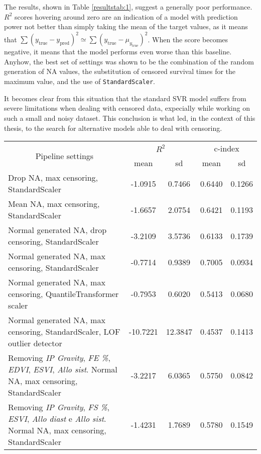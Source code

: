\documentclass[12pt]{report}
\begin{document}
The results, shown in Table \ref{resultstab:1}, suggest a generally poor performance. $R^2$ scores hovering around zero are an indication of a model with prediction power not better than simply taking the mean of the target values, as it means that $\sum(y_{\text{true}} - y_{\text{pred}})^2 \simeq \sum(y_{\text{true}} - \mu_{y_{\text{true}}})^2$. When the score becomes negative, it means that the model performs even worse than this baseline. Anyhow, the best set of settings was shown to be the combination of the random generation of NA values, the substitution of censored survival times for the maximum value, and the use of \texttt{StandardScaler}.

It becomes clear from this situation that the standard SVR model suffers from severe limitations when dealing with censored data, expecially while working on such a small and noisy dataset. This conclusion is what led, in the context of this thesis, to the search for alternative models able to deal with censoring.

\begin{center}
 \begin{tabular}{ |m{7cm}|c|c|c|c| }
\hline
\multicolumn{1}{|c|}{\multirow{2}{*}{Pipeline settings}} & \multicolumn{2}{|c|}{$R^2$} & \multicolumn{2}{|c|}{c-index} \\ \cline{2-5}
& mean & sd & mean & sd \\ \hline
Drop NA, max censoring, StandardScaler & -1.0915 & 0.7466 & 0.6440 & 0.1266 \\ \hline
Mean NA, max censoring, StandardScaler & -1.6657 & 2.0754 & 0.6421 & 0.1193 \\ \hline
Normal generated NA, drop censoring, StandardScaler & -3.2109 & 3.5736 & 0.6133 & 0.1739 \\ \hline
Normal generated NA, max censoring, StandardScaler & -0.7714 & 0.9389 & 0.7005 & 0.0934 \\ \hline
Normal generated NA, max censoring, QuantileTransformer scaler & -0.7953 & 0.6020 & 0.5413 & 0.0680 \\ \hline
Normal generated NA, max censoring, StandardScaler, LOF outlier detector & -10.7221 & 12.3847 & 0.4537 & 0.1413 \\ \hline
Removing \textit{IP Gravity}, \textit{FE \%}, \textit{EDVI}, \textit{ESVI}, \textit{Allo sist}. Normal NA, max censoring, StandardScaler & -3.2217 & 6.0365 & 0.5750 & 0.0842 \\ \hline
Removing \textit{IP Gravity}, \textit{FS \%}, \textit{ESVI}, \textit{Allo diast} e \textit{Allo sist}. Normal NA, max censoring, StandardScaler & -1.4231 & 1.7689 & 0.5780 & 0.1549 \\ \hline
\end{tabular}
\label{resultstab:1}
\end{center} 
\end{document}
